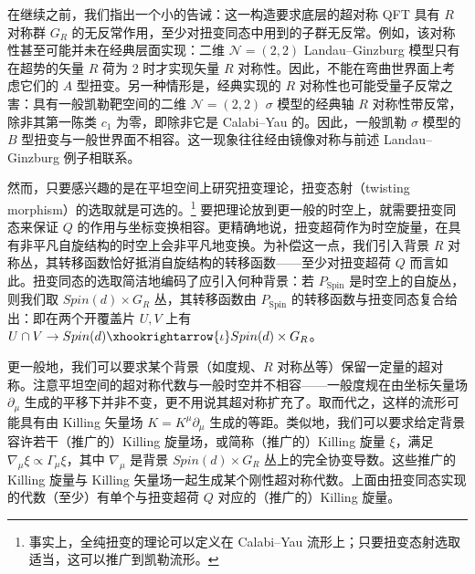 在继续之前，我们指出一个小的告诫：这一构造要求底层的超对称 QFT 具有 $R$ 对称群 $G_R$ 的无反常作用，至少对扭变同态中用到的子群无反常。例如，该对称性甚至可能并未在经典层面实现：二维 $\mathcal{N}=(2,2)$ Landau--Ginzburg 模型只有在超势的矢量 $R$ 荷为 2 时才实现矢量 $R$ 对称性。因此，不能在弯曲世界面上考虑它们的 $A$ 型扭变。另一种情形是，经典实现的 $R$ 对称性也可能受量子反常之害：具有一般凯勒靶空间的二维 $\mathcal{N}=(2,2)$ $\sigma$ 模型的经典轴 $R$ 对称性带反常，除非其第一陈类 $c_1$ 为零，即除非它是 Calabi--Yau 的。因此，一般凯勒 $\sigma$ 模型的 $B$ 型扭变与一般世界面不相容。这一现象往往经由镜像对称与前述 Landau--Ginzburg 例子相联系。

然而，只要感兴趣的是在平坦空间上研究扭变理论，扭变态射（twisting morphism）的选取就是可选的。\footnote{事实上，全纯扭变的理论可以定义在 Calabi--Yau 流形上；只要扭变态射选取适当，这可以推广到凯勒流形。} 要把理论放到更一般的时空上，就需要扭变同态来保证 $Q$ 的作用与坐标变换相容。更精确地说，扭变超荷作为时空旋量，在具有非平凡自旋结构的时空上会非平凡地变换。为补偿这一点，我们引入背景 $R$ 对称丛，其转移函数恰好抵消自旋结构的转移函数——至少对扭变超荷 $Q$ 而言如此。扭变同态的选取简洁地编码了应引入何种背景：若 $P_{\mathrm{Spin}}$ 是时空上的自旋丛，则我们取 $Spin(d)\times G_R$ 丛，其转移函数由 $P_{\mathrm{Spin}}$ 的转移函数与扭变同态复合给出：即在两个开覆盖片 $U,V$ 上有 $U\cap V\to Spin(d)\xhookrightarrow{\iota}Spin(d)\times G_R$。

更一般地，我们可以要求某个背景（如度规、$R$ 对称丛等）保留一定量的超对称。注意平坦空间的超对称代数与一般时空并不相容——一般度规在由坐标矢量场 $\partial_\mu$ 生成的平移下并非不变，更不用说其超对称扩充了。取而代之，这样的流形可能具有由 Killing 矢量场 $K=K^\mu\partial_\mu$ 生成的等距。类似地，我们可以要求给定背景容许若干（推广的）Killing 旋量场，或简称（推广的）Killing 旋量 $\xi$，满足 $\nabla_\mu\xi\propto\Gamma_\mu\xi$，其中 $\nabla_\mu$ 是背景 $Spin(d)\times G_R$ 丛上的完全协变导数。这些推广的 Killing 旋量与 Killing 矢量场一起生成某个刚性超对称代数。上面由扭变同态实现的代数（至少）有单个与扭变超荷 $Q$ 对应的（推广的）Killing 旋量。

